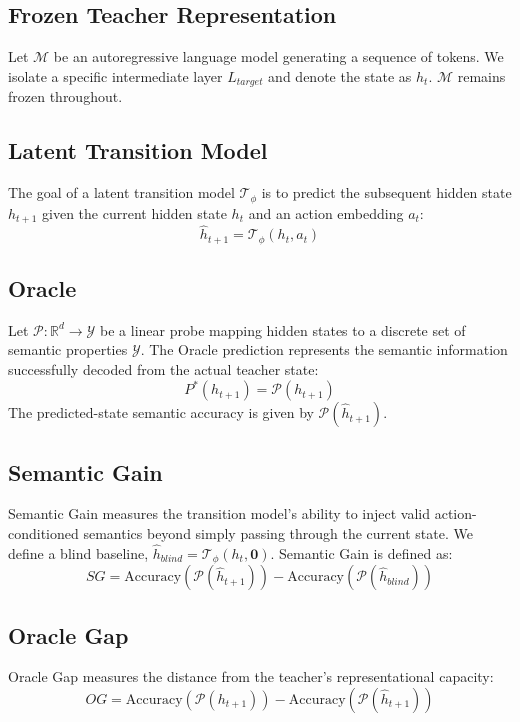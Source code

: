 \documentclass[conference]{IEEEtran}
\begin{document}
\subsection{Frozen Teacher Representation}
Let $\mathcal{M}$ be an autoregressive language model generating a sequence of tokens. We isolate a specific intermediate layer $L_{target}$ and denote the state as $h_t$. $\mathcal{M}$ remains frozen throughout.

\subsection{Latent Transition Model}
The goal of a latent transition model $\mathcal{T}_\phi$ is to predict the subsequent hidden state $h_{t+1}$ given the current hidden state $h_t$ and an action embedding $a_t$:
\begin{equation}
\hat h_{t+1} = \mathcal{T}_\phi(h_t, a_t)
\end{equation}

\subsection{Oracle}
Let $\mathcal{P} : \mathbb{R}^d \rightarrow \mathcal{Y}$ be a linear probe mapping hidden states to a discrete set of semantic properties $\mathcal{Y}$. The Oracle prediction represents the semantic information successfully decoded from the actual teacher state:
\begin{equation}
P^*(h_{t+1}) = \mathcal{P}(h_{t+1})
\end{equation}
The predicted-state semantic accuracy is given by $\mathcal{P}(\hat h_{t+1})$.

\subsection{Semantic Gain}
Semantic Gain measures the transition model's ability to inject valid action-conditioned semantics beyond simply passing through the current state. We define a blind baseline, $\hat h_{blind} = \mathcal{T}_\phi(h_t, \mathbf{0})$. Semantic Gain is defined as:
\begin{equation}
SG = \text{Accuracy}(\mathcal{P}(\hat h_{t+1})) - \text{Accuracy}(\mathcal{P}(\hat h_{blind}))
\end{equation}

\subsection{Oracle Gap}
Oracle Gap measures the distance from the teacher's representational capacity:
\begin{equation}
OG = \text{Accuracy}(\mathcal{P}(h_{t+1})) - \text{Accuracy}(\mathcal{P}(\hat h_{t+1}))
\end{equation}
\end{document}
